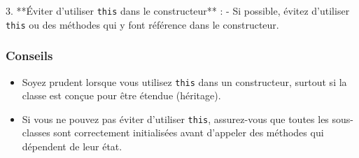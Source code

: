 \documentclass[a4paper,12pt]{article}
\begin{document}
3. **Éviter d'utiliser \texttt{this} dans le constructeur** :
   - Si possible, évitez d'utiliser \texttt{this} ou des méthodes qui y font référence dans le constructeur.

\subsubsection*{Conseils}
\begin{itemize}
    \item Soyez prudent lorsque vous utilisez \texttt{this} dans un constructeur, surtout si la classe est conçue pour être étendue (héritage).
    \item Si vous ne pouvez pas éviter d'utiliser \texttt{this}, assurez-vous que toutes les sous-classes sont correctement initialisées avant d'appeler des méthodes qui dépendent de leur état.
\end{itemize}
\end{document}

